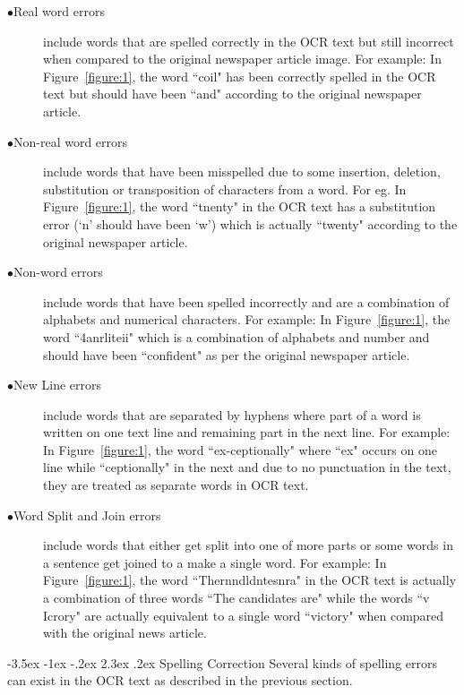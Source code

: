 \documentclass[12pt]{article}
\makeatletter
\renewcommand\section{\@startsection{section}{1}{\z@}%
                                  {-3.5ex \@plus -1ex \@minus -.2ex}%
                                  {2.3ex \@plus.2ex}%
                                  {\normalfont\bfseries}}
\makeatother
\begin{document}
\begin{description}
 \item[$\bullet$Real word errors] include words that are spelled correctly in the OCR text but still incorrect when compared to the original newspaper article image. For example: In Figure~\ref{figure:1}, the word ``coil"  has been correctly spelled in the OCR text  but should have been ``and" according to the original newspaper article. 
 \item[$\bullet$Non-real word errors] include words that have been misspelled due to some insertion, deletion, substitution or transposition of characters from a word. For eg. In Figure~\ref{figure:1}, the word ``tnenty" in the OCR text has a substitution error (`n' should have been `w') which is actually ``twenty" according to the original newspaper article.
 \item[$\bullet$Non-word errors] include words that have been spelled incorrectly and are a combination of alphabets and numerical characters. For example: In Figure~\ref{figure:1}, the word ``4anrliteii" which is a combination of alphabets and number and should have been ``confident" as per the original newspaper article.
\item[$\bullet$New Line errors] include words that are separated by hyphens where part of a word is written on one text line and remaining part in the next line. For example: In Figure~\ref{figure:1}, the word ``ex-ceptionally" where ``ex" occurs on one line while ``ceptionally" in the next and due to no punctuation in the text, they are treated as separate words in OCR text.
\item[$\bullet$Word Split and Join errors] include words that either get split into one of more parts or some words in a sentence get joined to a make a single word. For example: In Figure~\ref{figure:1}, the word ``Thernndldntesnra" in the OCR text is actually a combination of three words ``The candidates are" while the words ``v Icrory" are actually equivalent to a single word ``victory" when compared with the original news article.
\end{description} 





\section{Spelling Correction}
\label{spell:algo}
Several kinds of spelling errors can exist in the OCR text as described in the previous section. 
\end{document}

